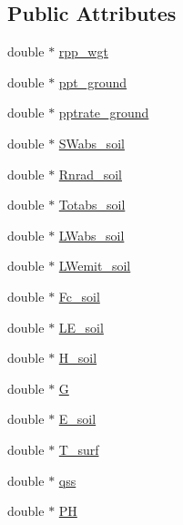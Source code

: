 \subsection*{Public Attributes}
\begin{DoxyCompactItemize}
\item 
double $\ast$ \hyperlink{class_vertical_soil_class_a6074da828ec9a698be69415d951e973b}{rpp\+\_\+wgt}
\item 
double $\ast$ \hyperlink{class_vertical_soil_class_aa74e27cf00dcf9d0eb8c085a492ee6ca}{ppt\+\_\+ground}
\item 
double $\ast$ \hyperlink{class_vertical_soil_class_ad4c3a05ac38c89fc760eee519fb635e4}{pptrate\+\_\+ground}
\item 
double $\ast$ \hyperlink{class_vertical_soil_class_a76743012d4dbc75feeb1c8afc0e36130}{S\+Wabs\+\_\+soil}
\item 
double $\ast$ \hyperlink{class_vertical_soil_class_acf9b7d31c2f88062d07679a6418d41b6}{Rnrad\+\_\+soil}
\item 
double $\ast$ \hyperlink{class_vertical_soil_class_a585e9266dd7317ba055b6f6ba2274ea3}{Totabs\+\_\+soil}
\item 
double $\ast$ \hyperlink{class_vertical_soil_class_a97dfd4263b6d4bb4edf18ea4bf08b442}{L\+Wabs\+\_\+soil}
\item 
double $\ast$ \hyperlink{class_vertical_soil_class_a11e05cd10d9890edbbc51611104495b4}{L\+Wemit\+\_\+soil}
\item 
double $\ast$ \hyperlink{class_vertical_soil_class_a19ecb5dde7f22d018fd9112e93fd21a3}{Fc\+\_\+soil}
\item 
double $\ast$ \hyperlink{class_vertical_soil_class_a039ca2eee87f50c04ff9f7be9bfd0a46}{L\+E\+\_\+soil}
\item 
double $\ast$ \hyperlink{class_vertical_soil_class_a2cd61c81c9cd73cf2809c05bd01dded6}{H\+\_\+soil}
\item 
double $\ast$ \hyperlink{class_vertical_soil_class_a97036f9923bf1f09af5e172679214f44}{G}
\item 
double $\ast$ \hyperlink{class_vertical_soil_class_a6c32b3e117d6d43b5b7eb7a8c6683294}{E\+\_\+soil}
\item 
double $\ast$ \hyperlink{class_vertical_soil_class_abcf764cb8b163ad2987cace01db22e51}{T\+\_\+surf}
\item 
double $\ast$ \hyperlink{class_vertical_soil_class_a2bfebc71d4ca3735220894c777bf5b3f}{qss}
\item 
double $\ast$ \hyperlink{class_vertical_soil_class_acadfed4b6bde454d7319feefc0a08f77}{PH}

\end{DoxyCompactItemize}
